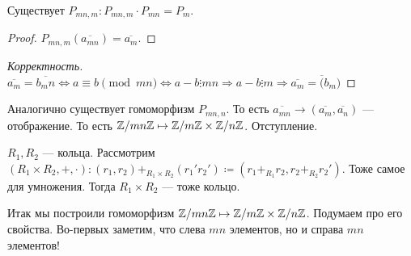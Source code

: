 Существует $P_{mn,m}: P_{mn, m} \cdot P_{mn} = P_{m}$. 
 \begin{proof}
     $P_{mn, m}(\overline{a_{mn}}) = \overline{a_m}$.
\end{proof}
\begin{proof}[Корректность]
    $\overline{a_m} = \overline{b_mn} \iff a \equiv b \pmod{mn} \iff a-b \vdots mn \Rightarrow a-b \vdots m \Rightarrow \overline{a_m} = \overline(b_m)$
\end{proof}
\slashn Аналогично существует гомоморфизм $P_{mn, n}$. То есть $\overline{a_{mn}} \rightarrow (\overline{a_m}, \overline{a_n})$ --- отображение. То есть $\mathbb{Z} / mn \mathbb{Z} \mapsto \mathbb{Z} / m\mathbb{Z} \times \mathbb{Z} / n \mathbb{Z}$.
Отступление.
\begin{definition}
    $R_1, R_2$ --- кольца. Рассмотрим  $(R_1 \times R_2, +, \cdot): (r_1, r_2) +_{R_1\times R_2} (r_1'r_2') \coloneqq (r_1+_{R_1}r_2, r_2+_{R_2}r_2')$. Тоже самое для умножения. Тогда $R_1 \times R_2$ --- тоже кольцо.
\end{definition}
\slashn
Итак мы построили гомоморфизм $\mathbb{Z} / mn \mathbb{Z} \mapsto \mathbb{Z} / m\mathbb{Z} \times \mathbb{Z} / n \mathbb{Z}$. Подумаем про его свойства. Во-первых заметим, что слева $mn$ элементов, но и справа $mn$ элементов!

